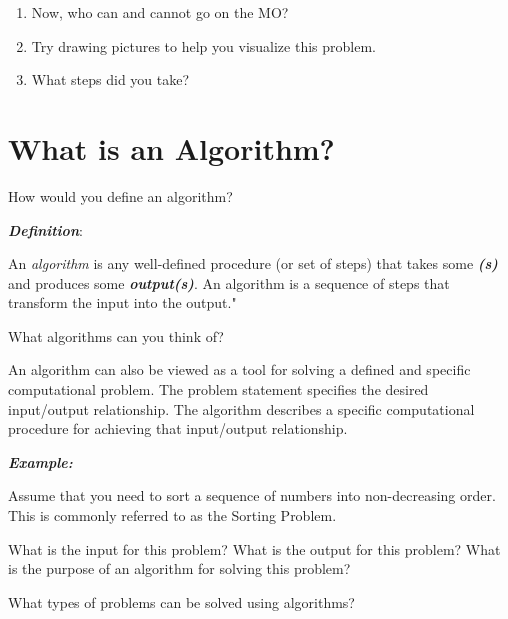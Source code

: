 \documentclass[12pt]{article}
\theoremstyle{definition}
\begin{document}
\begin{enumerate}
	\item Now, who can and cannot go on the MO?
\vfill
	\item Try drawing pictures to help you visualize this problem.
\vfill
	\item What steps did you take?
\vfill
\end{enumerate}


\newpage

\section{What is an Algorithm?}

How would you define an algorithm?

\vskip 4cm


\textbf{\emph{Definition}}:

An \emph{algorithm} is any well-defined procedure (or set of steps) that takes some \textbf{\emph{(s)}} and produces some \textbf{\emph{output(s)}}. An algorithm is a sequence of steps that transform the input into the output."

\vskip 0.5cm

What algorithms can you think of? 

\vskip 4cm

\newpage

An algorithm can also be viewed as a tool for solving a defined and specific computational problem. The problem statement specifies the desired input/output relationship. The algorithm describes a specific computational procedure for achieving that input/output relationship.

\vskip 0.25cm

\textbf{\emph{Example:}}

Assume that you need to sort a sequence of numbers into non-decreasing order. This is commonly referred to as the Sorting Problem. 

What is the input for this problem?
\vfill
What is the output for this problem?
\vfill
What is the purpose of an algorithm for solving this problem?
\vfill
\newpage





What types of problems can be solved using algorithms?
\end{document}
